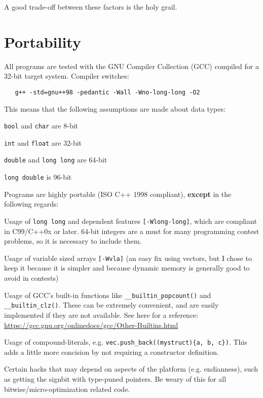A good trade-off between these factors is the holy grail.

\section*{Portability}

All programs are tested with the GNU Compiler Collection (GCC) compiled for a 32-bit target system. Compiler switches:

\begin{verbatim}
   g++ -std=gnu++98 -pedantic -Wall -Wno-long-long -O2
\end{verbatim}

This means that the following assumptions are made about data types:

\begin{compactitem}
	\item \texttt{bool} and \texttt{char} are 8-bit
	\item \texttt{int} and \texttt{float} are 32-bit
	\item \texttt{double} and \texttt{long long} are 64-bit
	\item \texttt{long double} is 96-bit
\end{compactitem}

Programs are highly portable (ISO C++ 1998 compliant), \textbf{except} in the following regards:

\begin{compactitem}
	\item Usage of \texttt{long long} and dependent features \texttt{[-Wlong-long]}, which are compliant in C99/C++0x or later. 64-bit integers are a must for many programming contest problems, so it is necessary to include them.
	\item Usage of variable sized arrays \texttt{[-Wvla]} (an easy fix using vectors, but I chose to keep it because it is simpler and because dynamic memory is generally good to avoid in contests)
	\item Usage of GCC's built-in functions like \texttt{\_\_builtin\_popcount()} and \texttt{\_\_builtin\_clz()}. These can be extremely convenient, and are easily implemented if they are not available. See here for a reference: \url{https://gcc.gnu.org/onlinedocs/gcc/Other-Builtins.html}
	\item Usage of compound-literals, e.g. \texttt{vec.push\_back((mystruct)\{a, b, c\})}. This adds a little more concision by not requiring a constructor definition.
	\item Certain hacks that may depend on aspects of the platform (e.g. endianness), such as getting the signbit with type-puned pointers. Be weary of this for all bitwise/micro-optimization related code.
\end{compactitem}


